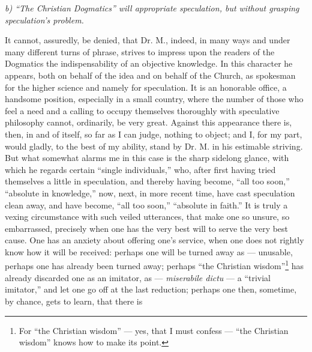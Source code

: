 \documentclass[12pt]{book}
\begin{document}
\begin{center}
\emph{b) ``The Christian Dogmatics'' will appropriate speculation, but without grasping speculation's problem.}
\end{center}

It cannot, assuredly, be denied, that Dr. M., indeed, in many ways and under many different turns of phrase, strives to impress upon the readers of the Dogmatics the indispensability of an objective knowledge. In this character he appears, both on behalf of the idea and on behalf of the Church, as spokesman for the higher science and namely for
speculation. It is an honorable office, a handsome position, especially in a small country, where the number of those who feel a need and a calling to occupy themselves thoroughly with speculative philosophy cannot, ordinarily, be very great. Against this appearance there is, then, in and of itself, so far as I can judge, nothing to object; and I, for my part, would gladly, to the best of my ability, stand by Dr. M. in his estimable striving. But what somewhat alarms me in this case is the sharp sidelong glance, with which he regards certain ``single individuals,'' who, after first having tried themselves a little in speculation, and thereby having become, ``all too soon,'' ``absolute in knowledge,'' now, next, in more recent time, have cast speculation clean away, and have become, ``all too soon,'' ``absolute in faith.'' It is truly a vexing circumstance with such veiled utterances, that make one so unsure, so embarrassed, precisely when one has the very best will to serve the very best cause. One has an anxiety about offering one's service, when one does not rightly know how it will be received: perhaps one will be turned away as --- unusable, perhaps one has already been turned away; perhaps ``the Christian wisdom''\footnote{For ``the Christian wisdom'' --- yes, that I must confess --- ``the Christian wisdom'' knows how to make its point.} has already discarded one as an imitator, as --- \textit{miserabile dictu} --- a ``trivial imitator,'' and let one go off at the last reduction; perhaps one then, sometime, by chance, gets to learn, that there is
\end{document}
